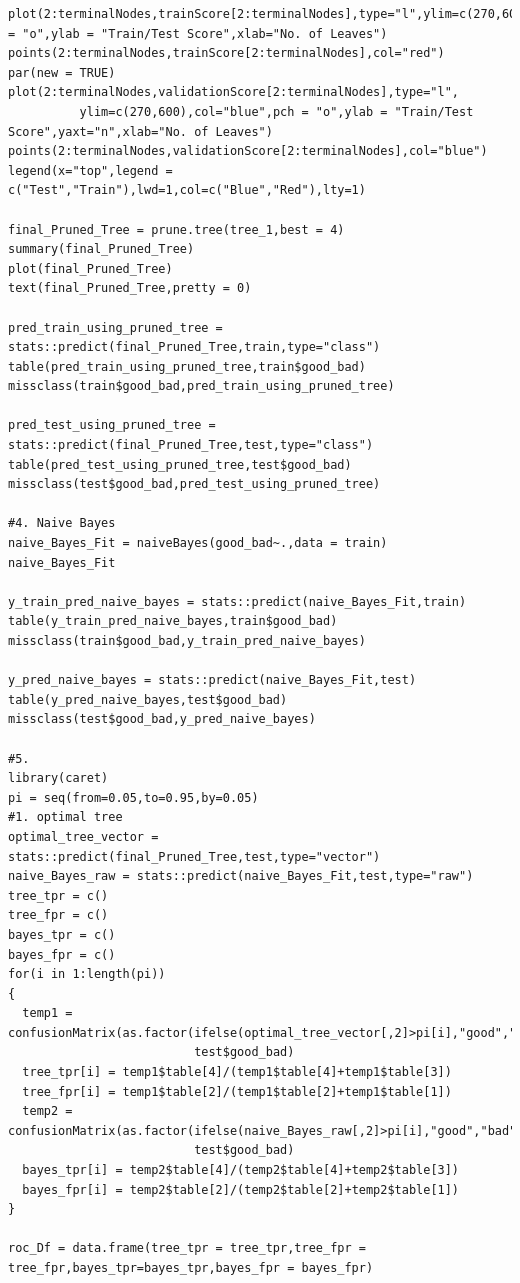 \documentclass[a4paper,10pt]{article}
\begin{document}
\begin{lstlisting}
plot(2:terminalNodes,trainScore[2:terminalNodes],type="l",ylim=c(270,600),col="red",pch = "o",ylab = "Train/Test Score",xlab="No. of Leaves")
points(2:terminalNodes,trainScore[2:terminalNodes],col="red")
par(new = TRUE)
plot(2:terminalNodes,validationScore[2:terminalNodes],type="l",
          ylim=c(270,600),col="blue",pch = "o",ylab = "Train/Test Score",yaxt="n",xlab="No. of Leaves")
points(2:terminalNodes,validationScore[2:terminalNodes],col="blue")
legend(x="top",legend = c("Test","Train"),lwd=1,col=c("Blue","Red"),lty=1)

final_Pruned_Tree = prune.tree(tree_1,best = 4)
summary(final_Pruned_Tree)
plot(final_Pruned_Tree)
text(final_Pruned_Tree,pretty = 0)

pred_train_using_pruned_tree = stats::predict(final_Pruned_Tree,train,type="class")
table(pred_train_using_pruned_tree,train$good_bad)
missclass(train$good_bad,pred_train_using_pruned_tree)

pred_test_using_pruned_tree = stats::predict(final_Pruned_Tree,test,type="class")
table(pred_test_using_pruned_tree,test$good_bad)
missclass(test$good_bad,pred_test_using_pruned_tree)

#4. Naive Bayes
naive_Bayes_Fit = naiveBayes(good_bad~.,data = train)
naive_Bayes_Fit

y_train_pred_naive_bayes = stats::predict(naive_Bayes_Fit,train)
table(y_train_pred_naive_bayes,train$good_bad)
missclass(train$good_bad,y_train_pred_naive_bayes)

y_pred_naive_bayes = stats::predict(naive_Bayes_Fit,test)
table(y_pred_naive_bayes,test$good_bad)
missclass(test$good_bad,y_pred_naive_bayes)

#5.
library(caret)
pi = seq(from=0.05,to=0.95,by=0.05)
#1. optimal tree
optimal_tree_vector = stats::predict(final_Pruned_Tree,test,type="vector")
naive_Bayes_raw = stats::predict(naive_Bayes_Fit,test,type="raw")
tree_tpr = c()
tree_fpr = c()
bayes_tpr = c()
bayes_fpr = c()
for(i in 1:length(pi))
{
  temp1 = confusionMatrix(as.factor(ifelse(optimal_tree_vector[,2]>pi[i],"good","bad")),
                          test$good_bad)
  tree_tpr[i] = temp1$table[4]/(temp1$table[4]+temp1$table[3])
  tree_fpr[i] = temp1$table[2]/(temp1$table[2]+temp1$table[1])
  temp2 = confusionMatrix(as.factor(ifelse(naive_Bayes_raw[,2]>pi[i],"good","bad")),
                          test$good_bad)
  bayes_tpr[i] = temp2$table[4]/(temp2$table[4]+temp2$table[3])
  bayes_fpr[i] = temp2$table[2]/(temp2$table[2]+temp2$table[1])
}

roc_Df = data.frame(tree_tpr = tree_tpr,tree_fpr = tree_fpr,bayes_tpr=bayes_tpr,bayes_fpr = bayes_fpr)


\end{lstlisting}
\end{document}

